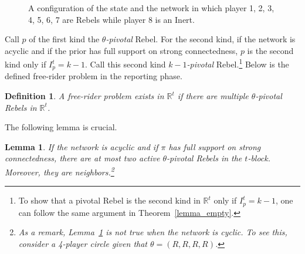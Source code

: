 \documentclass[12pt,letter]{article}
\newcommand{\Omicron}{\mathbb{R}}
\newtheorem{lemma}{Lemma}[section]
\newtheorem{definition}{Definition}[section]
\theoremstyle{definition}
\theoremstyle{remark}
\theoremstyle{claim}
\begin{document}
\begin{figure}


\begin{center}
\end{center}
\caption{A configuration of the state and the network in which player 1, 2, 3, 4, 5, 6, 7 are Rebels while player 8 is an Inert.}
\label{fig:k-1_pivotal}
\end{figure}

Call $p$ of the first kind the \textit{$\theta$-pivotal} Rebel. For the second kind, if the network is acyclic and if the prior has full support on strong connectedness, $p$ is the second kind only if $I^{t}_p=k-1$. Call this second kind \textit{$k-1$-pivotal} Rebel.\footnote{To show that a pivotal Rebel is the second kind in $\Omicron^{t}$ only if $I^{t}_p=k-1$, one can follow the same argument in Theorem~\ref{lemma_empty}.} Below is the defined free-rider problem in the reporting phase.

\begin{definition}
A free-rider problem exists in $\Omicron^t$ if there are multiple $\theta$-pivotal Rebels in $\Omicron^t$.
\end{definition}



The following lemma is crucial. 
\begin{lemma}
\label{lemma_at_most_two_nodes}
If the network is acyclic and if $\pi$ has full support on strong connectedness, there are at most two active $\theta$-pivotal Rebels in the $t$-block. Moreover, they are neighbors.\footnote{As a remark, Lemma~\ref{lemma_at_most_two_nodes} is not true when the network is cyclic. To see this, consider a 4-player circle given that $\theta=(R,R,R,R)$.}
\end{lemma}
\end{document}
